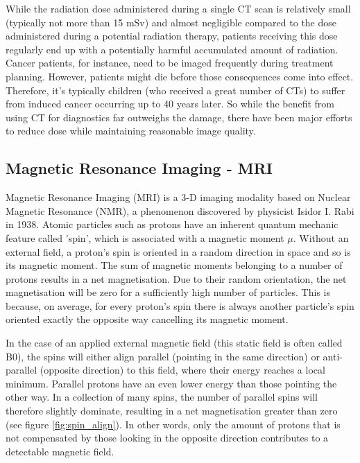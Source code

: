 While the radiation dose administered during a single CT scan is relatively small (typically not more than 15 mSv) and almost negligible compared to the dose administered during a potential radiation therapy, patients receiving this dose regularly end up with a potentially harmful accumulated amount of radiation.
Cancer patients, for instance, need to be imaged frequently during treatment planning.
However, patients might die before those consequences come into effect.
Therefore, it's typically children (who received a great number of CTs) to suffer from induced cancer occurring up to 40 years later.
So while the benefit from using CT for diagnostics far outweighs the damage, there have been major efforts to reduce dose while maintaining reasonable image quality.
\cite{Murphy2007, Brenner2001, Sodickson2009, Smith2007, McCollough2009, Goldman2013}


\subsection{Magnetic Resonance Imaging - MRI}
\label{sec:MRI}
Magnetic Resonance Imaging (MRI) is a 3-D imaging modality based on Nuclear Magnetic Resonance (NMR), a phenomenon discovered by physicist Isidor I. Rabi in 1938.
Atomic particles such as protons have an inherent quantum mechanic feature called 'spin', which is associated with a magnetic moment $\mu$.
Without an external field, a proton's spin is oriented in a random direction in space and so is its magnetic moment.
The sum of magnetic moments belonging to a number of protons results in a net magnetisation.
Due to their random orientation, the net magnetisation will be zero for a sufficiently high number of particles.
This is because, on average, for every proton's spin there is always another particle's spin oriented exactly the opposite way cancelling its magnetic moment.

In the case of an applied external magnetic field (this static field is often called B0), the spins will either align parallel (pointing in the same direction) or anti-parallel (opposite direction) to this field, where their energy reaches a local minimum.
Parallel protons have an even lower energy than those pointing the other way.
In a collection of many spins, the number of parallel spins will therefore slightly dominate, resulting in a net magnetisation greater than zero (see figure \ref{fig:spin_align}).
In other words, only the amount of protons that is not compensated by those looking in the opposite direction contributes to a detectable magnetic field.

